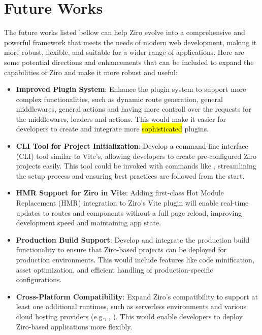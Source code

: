 \section{Future Works} %

The future works listed bellow can help Ziro evolve into a comprehensive and powerful framework that meets the needs of modern web development, making it more robust, flexible, and suitable for a wider range of applications. Here are some potential directions and enhancements that can be included to expand the capabilities of Ziro and make it more robust and useful:

\begin{itemize}
	\item  \textbf{Improved Plugin System}: Enhance the plugin system to support more complex functionalities, such as dynamic route generation, general middlewares, general actions and having more controll over the requests for the middlewares, loaders and actions. This would make it easier for developers to create and integrate more \hl{sophisticated} plugins.

	\item \textbf{CLI Tool for Project Initialization}: Develop a command-line interface (CLI) tool similar to Vite's, allowing developers to create pre-configured Ziro projects easily. This tool could be invoked with commands like , streamlining the setup process and ensuring best practices are followed from the start.

	\item \textbf{HMR Support for Ziro in Vite}: Adding first-class Hot Module Replacement (HMR) integration to Ziro's Vite plugin will enable real-time updates to routes and components without a full page reload, improving development speed and maintaining app state.

	\item \textbf{Production Build Support}: Develop and integrate the production build functionality to ensure that Ziro-based projects can be  deployed for production environments. This would include features like code minification, asset optimization, and efficient handling of production-specific configurations.

	\item  \textbf{Cross-Platform Compatibility}: Expand Ziro's compatibility to support at least one additional runtimes, such as serverless environments and various cloud hosting providers (e.g., , ). This would enable developers to deploy Ziro-based applications more flexibly.


\end{itemize}
